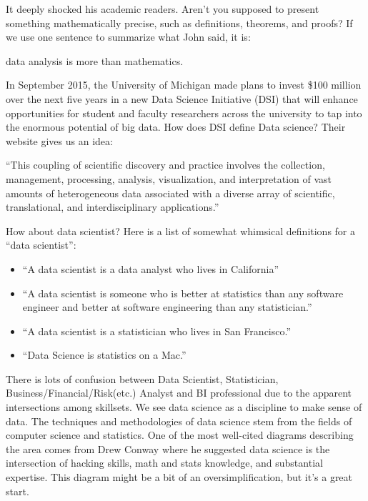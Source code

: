 \documentclass[12pt,]{krantz}
\providecommand{\tightlist}{%
  \setlength{\itemsep}{0pt}\setlength{\parskip}{0pt}}
\renewenvironment{quote}{\begin{VF}}{\end{VF}}
\theoremstyle{definition}
\theoremstyle{definition}
\theoremstyle{remark}
\begin{document}
It deeply shocked his academic readers. Aren't you supposed to present
something mathematically precise, such as definitions, theorems, and
proofs? If we use one sentence to summarize what John said, it is:

\begin{quote}
data analysis is more than mathematics.
\end{quote}

In September 2015, the University of Michigan made plans to invest \$100
million over the next five years in a new Data Science Initiative (DSI)
that will enhance opportunities for student and faculty researchers
across the university to tap into the enormous potential of big data.
How does DSI define Data science? Their website gives us an idea:

\begin{quote}
``This coupling of scientific discovery and practice involves the
collection, management, processing, analysis, visualization, and
interpretation of vast amounts of heterogeneous data associated with a
diverse array of scientific, translational, and interdisciplinary
applications.''
\end{quote}

How about data scientist? Here is a list of somewhat whimsical
definitions for a ``data scientist'':

\begin{itemize}
\tightlist
\item
  ``A data scientist is a data analyst who lives in California''
\item
  ``A data scientist is someone who is better at statistics than any
  software engineer and better at software engineering than any
  statistician.''
\item
  ``A data scientist is a statistician who lives in San Francisco.''
\item
  ``Data Science is statistics on a Mac.''
\end{itemize}

There is lots of confusion between Data Scientist, Statistician,
Business/Financial/Risk(etc.) Analyst and BI professional due to the
apparent intersections among skillsets. We see data science as a
discipline to make sense of data. The techniques and methodologies of
data science stem from the fields of computer science and statistics.
One of the most well-cited diagrams describing the area comes from Drew
Conway where he suggested data science is the intersection of hacking
skills, math and stats knowledge, and substantial expertise. This
diagram might be a bit of an oversimplification, but it's a great start.
\end{document}
